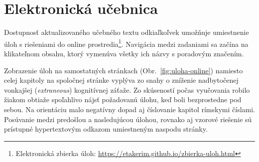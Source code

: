 \section{Elektronická učebnica}
Dostupnosť aktualizovaného učebného textu odkiaľkoľvek umožňuje umiestnenie úloh s riešeniami do online prostredia\footnote{Elektronická zbierka úloh: \url{https://etakerim.github.io/zbierka-uloh.html}}. Navigácia medzi zadaniami sa začína na klikateľnom obsahu, ktorý vymenúva všetky ich názvy s poradovým značením. 

Zobrazenie úloh na samostatných stránkach (Obr.~\ref{fig:uloha-online}) namiesto celej kapitoly na spoločnej stránke vyplýva zo snahy o zníženie nadbytočenej vonkajšej (\emph{extraneous}) kognitívnej záťaže. Zo skúseností počas vyučovania robilo žiakom obtiaže spoľahlivo nájsť požadovanú úlohu, keď boli bezprostedne pod sebou. Na orientáciu malo negatívny dopad aj číslovanie kapitol rímskymi číslami. Posúvanie medzi predošlou a nasledujúcou úlohou, rovnako aj vzorové riešenie sú prístupné hypertextovým odkazom umiestneným naspodu stránky.

